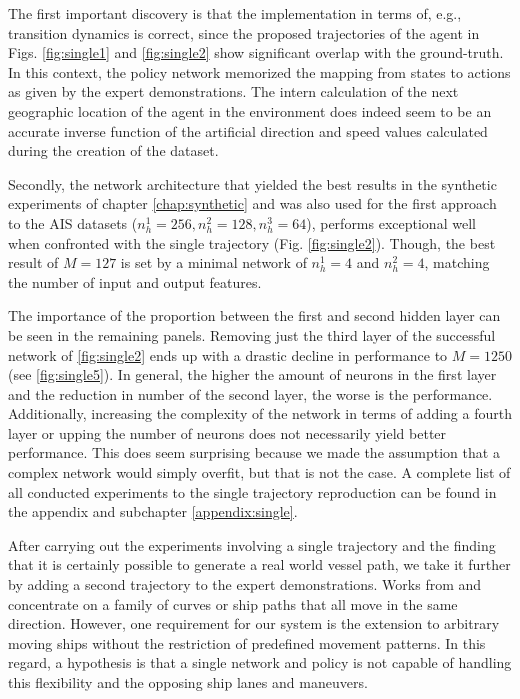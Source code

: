 The first important discovery is that the implementation in terms of, e.g., transition dynamics is correct, since the proposed trajectories of the agent in Figs. \ref{fig:single1} and \ref{fig:single2} show significant overlap with the ground-truth. In this context, the policy network memorized the mapping from states to actions as given by the expert demonstrations. The intern calculation of the next geographic location of the agent in the environment does indeed seem to be an accurate inverse function of the artificial direction and speed values calculated during the creation of the dataset.
\par
Secondly, the network architecture that yielded the best results in the synthetic experiments of chapter \ref{chap:synthetic} and was also used for the first approach to the AIS datasets ($n_h^1=256, n_h^2=128, n_h^3=64$), performs exceptional well when confronted with the single trajectory (Fig. \ref{fig:single2}). Though, the best result of $M=127$ is set by a minimal network of $n_h^1=4$ and $n_h^2=4$, matching the number of input and output features.
\par
The importance of the proportion between the first and second hidden layer can be seen in the remaining panels. Removing just the third layer of the successful network of \ref{fig:single2} ends up with a drastic decline in performance to $M=1250$ (see \ref{fig:single5}). In general, the higher the amount of neurons in the first layer and the reduction in number of the second layer, the worse is the performance. Additionally, increasing the complexity of the network in terms of adding a fourth layer or upping the number of neurons does not necessarily yield better performance. This does seem surprising because we made the assumption that a complex network would simply overfit, but that is not the case. A complete list of all conducted experiments to the single trajectory reproduction can be found in the appendix and subchapter \ref{appendix:single}.
\par
After carrying out the experiments involving a single trajectory and the finding that it is certainly possible to generate a real world vessel path, we take it further by adding a second trajectory to the expert demonstrations. Works from \cite{edgardo} and \cite{martinsen2018curved} concentrate on a family of curves or ship paths that all move in the same direction. However, one requirement for our system is the extension to arbitrary moving ships without the restriction of predefined movement patterns. In this regard, a hypothesis is that a single network and policy is not capable of handling this flexibility and the opposing ship lanes and maneuvers.
